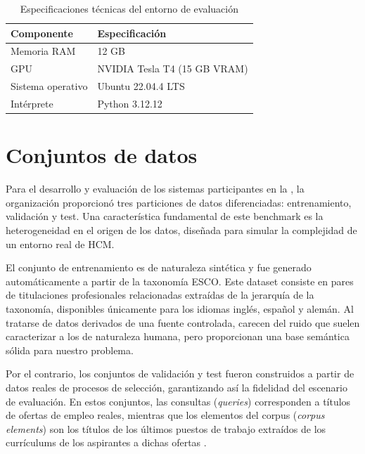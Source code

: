 \begin{table}[!ht]
    \centering
    \begin{tabular}{|l|l|}
        \hline
        \textbf{Componente} & \textbf{Especificación}      \\ \hline
        Memoria RAM         & 12 GB                        \\ \hline
        GPU                 & NVIDIA Tesla T4 (15 GB VRAM) \\ \hline
        Sistema operativo   & Ubuntu 22.04.4 LTS           \\ \hline
        Intérprete          & Python 3.12.12               \\ \hline
    \end{tabular}
    \caption{Especificaciones técnicas del entorno de evaluación}
    \label{tab:especificaciones_sistema}
\end{table}


\section{Conjuntos de datos}
\label{sec:Datasets}

\noindent Para el desarrollo y evaluación de los sistemas participantes en la , la organización proporcionó tres particiones de datos diferenciadas: entrenamiento, validación y test. Una característica fundamental de este benchmark es la heterogeneidad en el origen de los datos, diseñada para simular la complejidad de un entorno real de \gls{HCM}.

El conjunto de entrenamiento es de naturaleza sintética y fue generado automáticamente a partir de la taxonomía \gls{ESCO}. Este dataset consiste en pares de titulaciones profesionales relacionadas extraídas de la jerarquía de la taxonomía, disponibles únicamente para los idiomas inglés, español y alemán. Al tratarse de datos derivados de una fuente controlada, carecen del ruido que suelen caracterizar a los de naturaleza humana, pero proporcionan una base semántica sólida para nuestro problema.

Por el contrario, los conjuntos de validación y test fueron construidos a partir de datos reales de procesos de selección, garantizando así la fidelidad del escenario de evaluación. En estos conjuntos, las consultas (\textit{queries}) corresponden a títulos de ofertas de empleo reales, mientras que los elementos del corpus (\textit{corpus elements}) son los títulos de los últimos puestos de trabajo extraídos de los currículums de los aspirantes a dichas ofertas \cite{gasco2025overview}.

